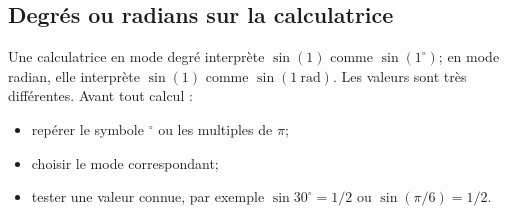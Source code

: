 \subsection{Degrés ou radians sur la calculatrice}

Une calculatrice en mode degré interprète $\sin(1)$ comme $\sin(1^\circ)$; en mode radian, elle interprète $\sin(1)$ comme $\sin(1\ \text{rad})$. Les valeurs sont très différentes. Avant tout calcul :
\begin{itemize}
\item repérer le symbole $^\circ$ ou les multiples de $\pi$;
\item choisir le mode correspondant;
\item tester une valeur connue, par exemple $\sin30^\circ=1/2$ ou $\sin(\pi/6)=1/2$.
\end{itemize}
